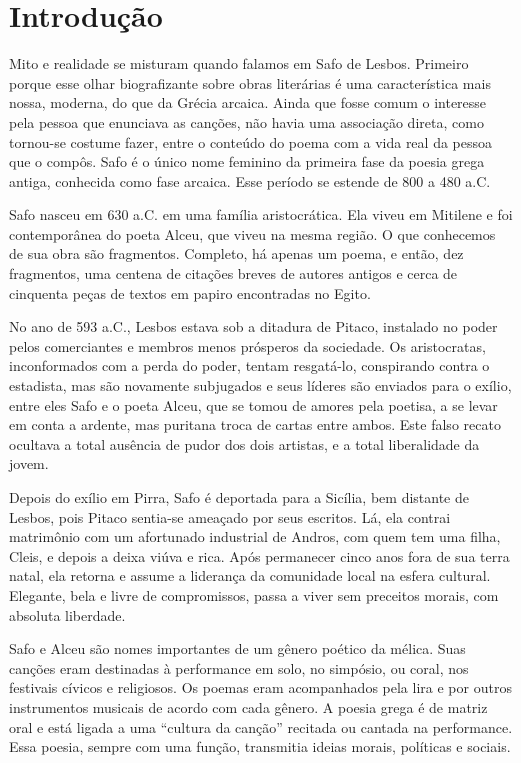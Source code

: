 \documentclass[12pt]{extarticle}
\begin{document}
\section{Introdução}


Mito e realidade se misturam quando falamos em Safo de Lesbos. Primeiro porque
esse olhar biografizante sobre obras literárias é uma característica mais nossa,
moderna, do que da Grécia arcaica. Ainda que fosse comum o interesse pela pessoa
que enunciava as canções, não havia uma associação direta, como tornou-se costume
fazer, entre o conteúdo do poema com a vida real da pessoa que o compôs.
Safo é o único nome feminino da primeira fase da poesia grega antiga, conhecida 
como fase arcaica. Esse período se estende de 800 a 480 a.C.

Safo nasceu em 630 a.C. em uma família aristocrática. Ela viveu em Mitilene e foi 
contemporânea do poeta Alceu, que viveu na mesma região. O que conhecemos de sua
obra são fragmentos. Completo, há apenas um poema, e então, dez fragmentos, uma centena 
de citações breves de autores antigos e cerca de cinquenta peças de textos em papiro
encontradas no Egito.

No ano de 593 a.C., Lesbos estava sob a ditadura de Pitaco, instalado no poder pelos 
comerciantes e membros menos prósperos da sociedade. Os aristocratas, inconformados 
com a perda do poder, tentam resgatá-lo, conspirando contra o estadista, mas são 
novamente subjugados e seus líderes são enviados para o exílio, entre eles Safo e 
o poeta Alceu, que se tomou de amores pela poetisa, a se levar em conta a ardente, 
mas puritana troca de cartas entre ambos. Este falso recato ocultava a total ausência 
de pudor dos dois artistas, e a total liberalidade da jovem.

Depois do exílio em Pirra, Safo é deportada para a Sicília, bem distante de Lesbos, 
pois Pitaco sentia-se ameaçado por seus escritos. Lá, ela contrai matrimônio com um 
afortunado industrial de Andros, com quem tem uma filha, Cleis, e depois a deixa 
viúva e rica. Após permanecer cinco anos fora de sua terra natal, ela retorna e 
assume a liderança da comunidade local na esfera cultural. Elegante, bela e livre 
de compromissos, passa a viver sem preceitos morais, com absoluta liberdade.

Safo e Alceu são nomes importantes de um gênero poético da mélica. Suas canções 
eram destinadas à performance em solo, no simpósio, ou coral, nos festivais cívicos 
e religiosos. Os poemas eram acompanhados pela lira e por outros instrumentos musicais 
de acordo com cada gênero. A poesia grega é de matriz oral e está ligada a uma 
“cultura da canção” recitada ou cantada na performance. Essa poesia, sempre com uma 
função, transmitia ideias morais, políticas e sociais.
\end{document}
